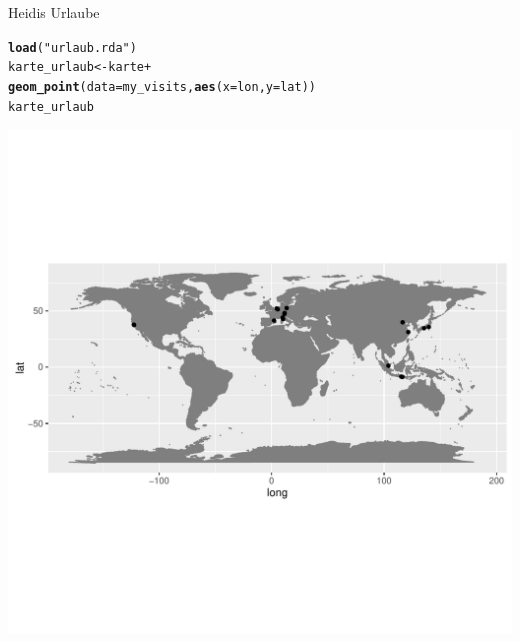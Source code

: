 \documentclass{beamer}\usepackage[]{graphicx}\usepackage[]{color}
\makeatletter
\newcommand{\hlstr}[1]{\textcolor[rgb]{0.192,0.494,0.8}{#1}}%
\newcommand{\hlopt}[1]{\textcolor[rgb]{0,0,0}{#1}}%
\newcommand{\hlstd}[1]{\textcolor[rgb]{0.345,0.345,0.345}{#1}}%
\newcommand{\hlkwb}[1]{\textcolor[rgb]{0.69,0.353,0.396}{#1}}%
\newcommand{\hlkwc}[1]{\textcolor[rgb]{0.333,0.667,0.333}{#1}}%
\newcommand{\hlkwd}[1]{\textcolor[rgb]{0.737,0.353,0.396}{\textbf{#1}}}%
\newenvironment{kframe}{%
 \def\at@end@of@kframe{}%
 \ifinner\ifhmode%
  \def\at@end@of@kframe{\end{minipage}}%
  \begin{minipage}{\columnwidth}%
 \fi\fi%
 \def\FrameCommand##1{\hskip\@totalleftmargin \hskip-\fboxsep
 \colorbox{shadecolor}{##1}\hskip-\fboxsep
     \hskip-\linewidth \hskip-\@totalleftmargin \hskip\columnwidth}%
 \MakeFramed {\advance\hsize-\width
   \@totalleftmargin\z@ \linewidth\hsize
   \@setminipage}}%
 {\par\unskip\endMakeFramed%
 \at@end@of@kframe}
\newenvironment{knitrout}{}{} %
\makeatother
\begin{document}
\begin{frame}[fragile]{Heidis Urlaube}
\small
\begin{knitrout}
\color{fgcolor}\begin{kframe}
\begin{alltt}
\hlkwd{load}\hlstd{(}\hlstr{"urlaub.rda"}\hlstd{)}
\hlstd{karte_urlaub} \hlkwb{<-} \hlstd{karte} \hlopt{+}
  \hlkwd{geom_point}\hlstd{(}\hlkwc{data} \hlstd{= my_visits,} \hlkwd{aes}\hlstd{(}\hlkwc{x} \hlstd{= lon,} \hlkwc{y} \hlstd{= lat))}
\hlstd{karte_urlaub}
\end{alltt}
\end{kframe}
\end{knitrout}
\includegraphics[width = \textwidth, trim={0 10em 0em 10em}, clip]{figure/urlaubskarte-1}
\end{frame}
\end{document}
